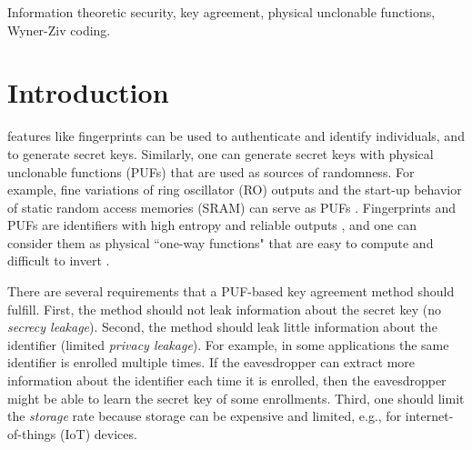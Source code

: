 \documentclass[journal,10pt,twoside]{IEEEtran}
\begin{document}
\begin{keywords}
Information theoretic security, key agreement, physical unclonable functions, Wyner-Ziv coding. 
\end{keywords}
\section{Introduction}
 features like fingerprints can be used to authenticate and identify individuals, and to generate secret keys. Similarly, one can generate secret keys with physical unclonable functions (PUFs) that are used as sources of randomness. For example, fine variations of ring oscillator (RO) outputs and the start-up behavior of static random access memories (SRAM) can serve as PUFs \cite{bizimtemperature}. Fingerprints and PUFs are identifiers with high entropy and reliable outputs \cite{IgnaTrans,GassendThesis}, and one can consider them as physical ``one-way functions" that are easy to compute and difficult to invert \cite{PappuThesis}. 

There are several requirements that a PUF-based key agreement method should fulfill. First, the method should not leak information about the secret key (no \textit{secrecy leakage}). Second, the method should leak little information about the identifier (limited \textit{privacy leakage}). For example, in some applications the same identifier is enrolled multiple times. If the eavesdropper can extract more information about the identifier each time it is enrolled, then the eavesdropper might be able to learn the secret key of some enrollments. Third, one should limit the \textit{storage} rate because storage can be expensive and limited, e.g., for internet-of-things (IoT) devices. 
\vspace{-0.35cm}
\end{document}
